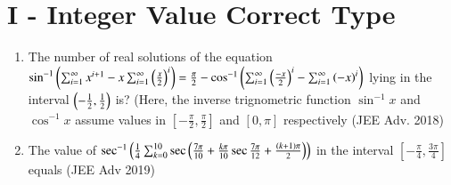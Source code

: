 \documentclass[journal,12pt,twocolumn]{IEEEtran}
\theoremstyle{remark}
\begin{document}
\twocolumn
\section*{I - Integer Value Correct Type}
\begin{enumerate}
	\item{
		The number of real solutions of the equation $\sin ^{-1}\left(\sum_{i=1}^{\infty} x^{i+1}-x \sum_{i=1}^{\infty} \left(\frac{x}{2}\right)^i\right) = \frac{\pi}{2} - \cos^{-1}\left(\sum_{i=1}^{\infty}\left(\frac{-x}{2}\right)^i-\sum_{i=1}^{\infty} \left(-x\right)^i\right)$ lying in the interval $\left(-\frac{1}{2},\frac{1}{2}\right)$ is? (Here, the inverse trignometric function $\sin^{-1}x$ and $\cos^{-1}x$ assume values in $[-\frac{\pi}{2}, \frac{\pi}{2}]$ and $[0, \pi]$ respectively \hfill (JEE Adv. 2018)
}
\\
\item{
		The value of $\sec^{-1}\left(\frac{1}{4}\sum_{k=0}^{10} \sec\left(\frac{7\pi}{10}+\frac{k\pi}{10} \sec{\frac{7\pi}{12}+\frac{\ensuremath{\left(k+1\right)}\pi}{2}}\right)\right)$ in the interval $[-\frac{\pi}{4},\frac{3\pi}{4}]$ equals \hfill (JEE Adv 2019)	
	}
\end{enumerate}
\end{document}

